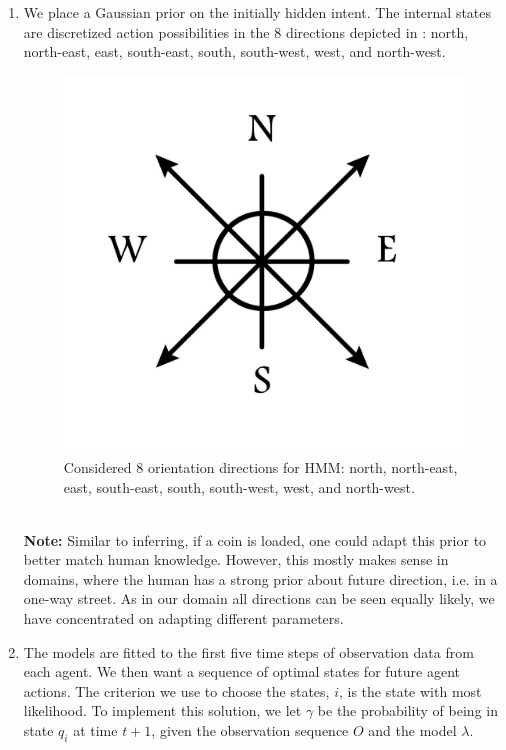 \begin{enumerate}
    \item We place a Gaussian prior on the initially hidden intent. The internal states are discretized action possibilities in the $8$ directions depicted in \label{dir}: north, north-east, east, south-east, south, south-west, west, and north-west.
    \begin{figure}
        \centering
        \includegraphics[scale=0.5]{figures/compass.jpg}
        \caption{Considered 8 orientation directions for HMM: north, north-east, east, south-east, south, south-west, west, and north-west.}
        \label{fig:dir}
    \end{figure} \\ 
    \textbf{Note:} Similar to inferring, if a coin is loaded, one could adapt this prior to better match human knowledge. However, this mostly makes sense in domains, where the human has a strong prior about future direction, i.e. in a one-way street. As in our domain all directions can be seen equally likely, we have concentrated on adapting different parameters.
    \item The models are fitted to the first five time steps of observation data from each agent. We then want a sequence of optimal states for future agent actions. 
    The criterion we use to choose the states, $i$, is the state with most likelihood. To implement this solution, we let $\gamma$ be the probability of being in state $q_i$ at time $t+1$, given the observation sequence $O$ and the model $\lambda$.

\end{enumerate}
